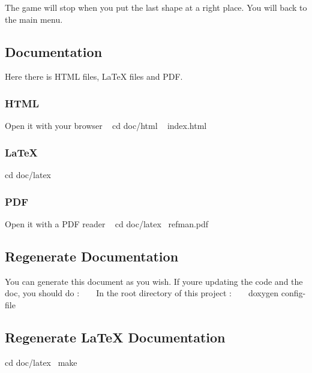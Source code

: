 The game will stop when you put the last shape at a right place. You will back to the main menu.

\subsection*{Documentation}

Here there is H\+T\+ML files, La\+TeX files and P\+DF. \subsubsection*{H\+T\+ML}

Open it with your browser ~\newline
 {\ttfamily cd doc/html} ~\newline
 {\ttfamily index.\+html} \subsubsection*{La\+TeX}

{\ttfamily cd doc/latex} \subsubsection*{P\+DF}

Open it with a P\+DF reader ~\newline
 {\ttfamily cd doc/latex}~\newline
 {\ttfamily refman.\+pdf}

\subsection*{Regenerate Documentation}

You can generate this document as you wish. If you\textquotesingle{}re updating the code and the doc, you should do \+: ~\newline
~\newline
 In the root directory of this project \+: ~\newline
~\newline
 {\ttfamily doxygen config-\/file}~\newline
 \subsection*{Regenerate La\+TeX Documentation}

{\ttfamily cd doc/latex}~\newline
 {\ttfamily make}~\newline
 